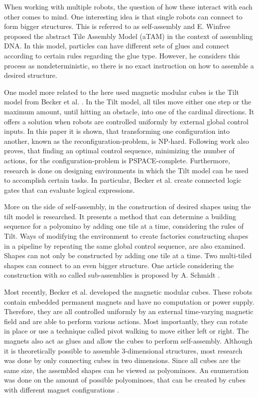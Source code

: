 When working with multiple robots, the question of how these interact with each other comes to mind.
One interesting idea is that single robots can connect to form bigger structures.
This is referred to as self-assembly and E. Winfree \cite{winfree1998} proposed the abstract Tile Assembly Model (aTAM) in the context of assembling DNA.
In this model, particles can have different sets of glues and connect according to certain rules regarding the glue type.
However, he considers this process as nondeterministic, so there is no exact instruction on how to assemble a desired structure.

One model more related to the here used magnetic modular cubes is the Tilt model from Becker et al. \cite{Becker2014_SP}.
In the Tilt model, all tiles move either one step or the maximum amount, until hitting an obstacle, into one of the cardinal directions.
It offers a solution when robots are controlled uniformly by external global control inputs.
In this paper it is shown, that transforming one configuration into another, known as the reconfiguration-problem, is NP-hard.
Following work \cite{Becker2014} also proves, that finding an optimal control sequence, minimizing the number of actions, for the configuration-problem is PSPACE-complete.
Furthermore, research is done on designing environments in which the Tilt model can be used to accomplish certain tasks.
In particular, Becker et al. \cite{Becker2014} create connected logic gates that can evaluate logical expressions.

More on the side of self-assembly, in \cite{Fekete2020} the construction of desired shapes using the tilt model is researched.
It presents a method that can determine a building sequence for a polyomino by adding one tile at a time, considering the rules of Tilt.
Ways of modifying the environment to create factories constructing shapes in a pipeline by repeating the same global control sequence, are also examined.
Shapes can not only be constructed by adding one tile at a time.
Two multi-tiled shapes can connect to an even bigger structure.
One article considering the construction with so called sub-assemblies is proposed by A. Schmidt \cite{Schmidt2018}.

Most recently, Becker et al. \cite{Becker2022} developed the magnetic modular cubes.
These robots contain embedded permanent magnets and have no computation or power supply.
Therefore, they are all controlled uniformly by an external time-varying magnetic field and are able to perform various actions.
Most importantly, they can rotate in place or use a technique called pivot walking to move either left or right.
The magnets also act as glues and allow the cubes to perform self-assembly.
Although it is theoretically possible to assemble 3-dimensional structures, most research was done by only connecting cubes in two dimensions.
Since all cubes are the same size, the assembled shapes can be viewed as polyominoes.
An enumeration was done on the amount of possible polyominoes, that can be created by cubes with different magnet configurations \cite{Becker2021}.

